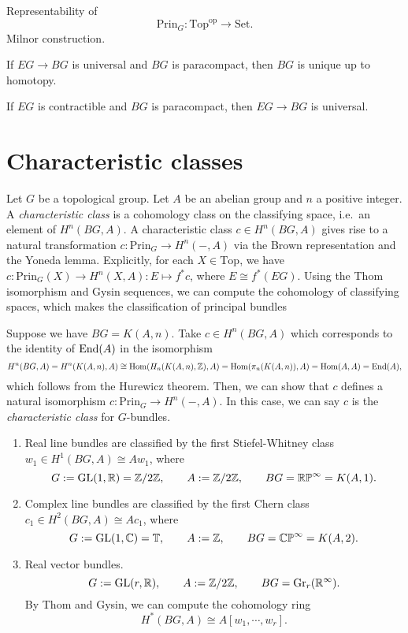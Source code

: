 \documentclass{../../large}
\begin{document}
\begin{prb}
Representability of
\[\mathrm{Prin}_G:\mathrm{Top}^{\mathrm{op}}\to\mathrm{Set}.\]
Milnor construction.

\begin{prb}
\item If $EG\to BG$ is universal and $BG$ is paracompact, then $BG$ is unique up to homotopy.
\item If $EG$ is contractible and $BG$ is paracompact, then $EG\to BG$ is universal.
\end{prb}
\end{prb}




\section{Characteristic classes}

\begin{prb}
Let $G$ be a topological group.
Let $A$ be an abelian group and $n$ a positive integer.
A \emph{characteristic class} is a cohomology class on the classifying space, i.e.~an element of $H^n(BG,A)$.
A characteristic class $c\in H^n(BG,A)$ gives rise to a natural transformation $c:\mathrm{Prin}_G\to H^n(-,A)$ via the Brown representation and the Yoneda lemma.
Explicitly, for each $X\in\mathrm{Top}$, we have $c:\mathrm{Prin}_G(X)\to H^n(X,A):E\mapsto f^*c$, where $E\cong f^*(EG)$.
Using the Thom isomorphism and Gysin sequences, we can compute the cohomology of classifying spaces, which makes the classification of principal bundles

Suppose we have $BG=K(A,n)$.
Take $c\in H^n(BG,A)$ which corresponds to the identity of $\operatorname{End}(A)$ in the isomorphism
\[H^n(BG,A)=H^n(K(A,n),A)\cong\operatorname{Hom}(H_n(K(A,n),\mathbb{Z}),A)=\operatorname{Hom}(\pi_n(K(A,n)),A)=\operatorname{Hom}(A,A)=\operatorname{End}(A),\]
which follows from the Hurewicz theorem.
Then, we can show that $c$ defines a natural isomorphism $c:\mathrm{Prin}_G\to H^n(-,A)$.
In this case, we can say $c$ is the \emph{characteristic class} for $G$-bundles.
\end{prb}

\begin{enumerate}
\item Real line bundles are classified by the first Stiefel-Whitney class $w_1\in H^1(BG,A)\cong Aw_1$, where
\[G:=\mathrm{GL}(1,\mathbb{R})=\mathbb{Z}/2\mathbb{Z},\qquad A:=\mathbb{Z}/2\mathbb{Z},\qquad BG=\mathbb{RP}^\infty=K(A,1).\]
\item Complex line bundles are classified by the first Chern class $c_1\in H^2(BG,A)\cong Ac_1$, where
\[G:=\mathrm{GL}(1,\mathbb{C})=\mathbb{T},\qquad A:=\mathbb{Z},\qquad BG=\mathbb{CP}^\infty=K(A,2).\]
\item Real vector bundles.
\[G:=\mathrm{GL}(r,\mathbb{R}),\qquad A:=\mathbb{Z}/2\mathbb{Z},\qquad BG=\mathrm{Gr}_r(\mathbb{R}^\infty).\]
By Thom and Gysin, we can compute the cohomology ring
\[H^*(BG,A)\cong A[w_1,\cdots,w_r].\]
\end{enumerate}
\end{document}
